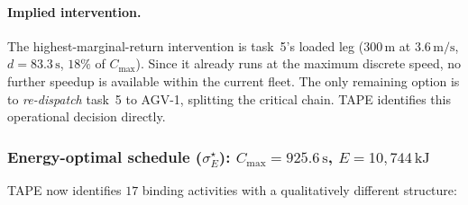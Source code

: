\documentclass[11pt]{article}
\begin{document}
\paragraph{Implied intervention.}
The highest-marginal-return intervention is task~5's loaded leg (300\,m at $3.6\,\mathrm{m/s}$,
$d=83.3\,\mathrm{s}$, $18\%$ of $C_{\max}$). Since it already runs at the maximum
discrete speed, no further speedup is available within the current fleet. The only
remaining option is to \emph{re-dispatch} task~5 to AGV-1, splitting the critical chain.
TAPE identifies this operational decision directly.

\subsubsection{Energy-optimal schedule ($\sigma^\star_{E}$): $C_{\max}=925.6\,\mathrm{s}$, $E=10{,}744\,\mathrm{kJ}$}

TAPE now identifies $17$ binding activities with a qualitatively different structure:
\end{document}
